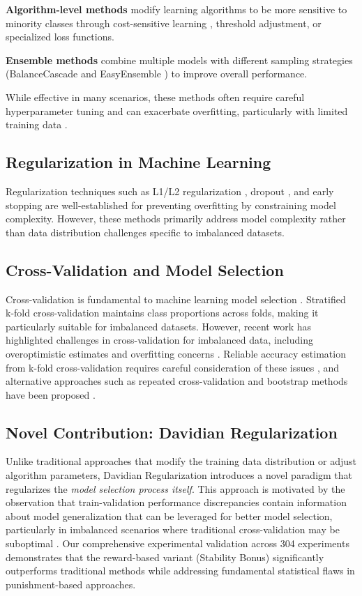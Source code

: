 \documentclass[twoside,11pt]{article}
\begin{document}
\textbf{Algorithm-level methods} modify learning algorithms to be more sensitive to minority classes through cost-sensitive learning \citep{elkan2001foundations}, threshold adjustment, or specialized loss functions.

\textbf{Ensemble methods} combine multiple models with different sampling strategies (BalanceCascade and EasyEnsemble \citep{liu2009exploratory}) to improve overall performance.

While effective in many scenarios, these methods often require careful hyperparameter tuning and can exacerbate overfitting, particularly with limited training data \citep{garcia2012effectiveness}.

\subsection{Regularization in Machine Learning}
Regularization techniques such as L1/L2 regularization \citep{tibshirani1996regression}, dropout \citep{srivastava2014dropout}, and early stopping are well-established for preventing overfitting by constraining model complexity. However, these methods primarily address model complexity rather than data distribution challenges specific to imbalanced datasets.

\subsection{Cross-Validation and Model Selection}
Cross-validation is fundamental to machine learning model selection \citep{stone1974cross,arlot2010survey}. Stratified k-fold cross-validation \citep{kohavi1995study} maintains class proportions across folds, making it particularly suitable for imbalanced datasets. However, recent work has highlighted challenges in cross-validation for imbalanced data, including overoptimistic estimates and overfitting concerns \citep{santos2018cross}. Reliable accuracy estimation from k-fold cross-validation requires careful consideration of these issues \citep{wong2019reliable}, and alternative approaches such as repeated cross-validation and bootstrap methods have been proposed \citep{kim2009estimating}.

\subsection{Novel Contribution: Davidian Regularization}
Unlike traditional approaches that modify the training data distribution or adjust algorithm parameters, Davidian Regularization introduces a novel paradigm that regularizes the \textit{model selection process itself}. This approach is motivated by the observation that train-validation performance discrepancies contain information about model generalization that can be leveraged for better model selection, particularly in imbalanced scenarios where traditional cross-validation may be suboptimal \citep{santos2018cross}. Our comprehensive experimental validation across 304 experiments demonstrates that the reward-based variant (Stability Bonus) significantly outperforms traditional methods while addressing fundamental statistical flaws in punishment-based approaches.
\end{document}
